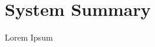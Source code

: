 \documentclass[tom-ari]{subfile}
\begin{document}
	
\chapter{System Summary}

Lorem Ipsum

\lipsum[4]
	
\end{document}
